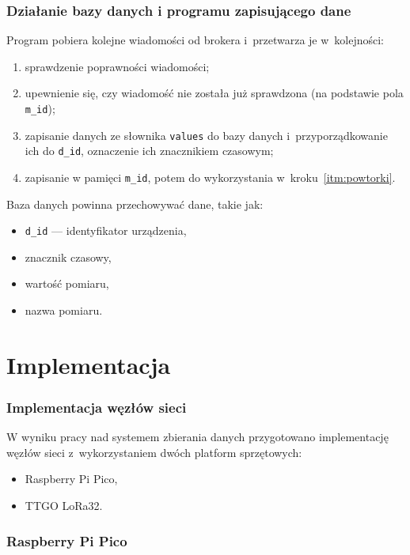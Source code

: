 \subsubsection{Działanie bazy danych i programu zapisującego dane}
Program pobiera kolejne wiadomości od brokera i~przetwarza je w~kolejności:
\begin{enumerate}
    \item sprawdzenie poprawności wiadomości;
    \item \label{itm:powtorki} upewnienie się, czy wiadomość nie została już sprawdzona (na podstawie pola \texttt{m\_id});
    \item zapisanie danych ze słownika \texttt{values} do bazy danych i~przyporządkowanie ich do \texttt{d\_id}, oznaczenie ich znacznikiem czasowym;
    \item zapisanie w pamięci \texttt{m\_id}, potem do wykorzystania w~kroku~\ref{itm:powtorki}.
\end{enumerate}
Baza danych powinna przechowywać dane, takie jak:
\begin{itemize}
    \item \texttt{d\_id} — identyfikator urządzenia,
    \item znacznik czasowy,
    \item wartość pomiaru,
    \item nazwa pomiaru.
\end{itemize}

\section{Implementacja}

\subsubsection{Implementacja węzłów sieci}
W wyniku pracy nad systemem zbierania danych przygotowano implementację węzłów sieci z~wykorzystaniem dwóch platform sprzętowych:
\begin{itemize}
    \item Raspberry Pi Pico,
    \item TTGO LoRa32.
\end{itemize}

\subsubsection{Raspberry Pi Pico}

